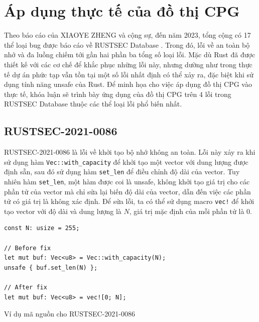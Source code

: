 \section{Áp dụng thực tế của đồ thị CPG}

Theo báo cáo của XIAOYE ZHENG và cộng sự, đến năm 2023, tổng cộng có 17 thể loại bug được báo cáo về RUSTSEC Database \cite{zheng2023closer}. Trong đó, lỗi về an toàn bộ nhớ và đa luồng chiếm tới gần hai phần ba tổng số loại lỗi. Mặc dù Rust đã được thiết kế với các cơ chế để khắc phục những lỗi này, nhưng dường như trong thực tế dự án phức tạp vẫn tồn tại một số lỗi nhất định có thể xảy ra, đặc biệt khi sử dụng tính năng unsafe của Rust. Để minh họa cho việc áp dụng đồ thị CPG vào thực tế, khóa luận sẽ trình bày ứng dụng của đồ thị CPG trên 4 lỗi trong RUSTSEC Database thuộc các thể loại lỗi phổ biến nhất.

\subsection{RUSTSEC-2021-0086}

RUSTSEC-2021-0086 là lỗi về khởi tạo bộ nhớ không an toàn. Lỗi này xảy ra khi sử dụng hàm \texttt{Vec::with\_capacity} để khởi tạo một vector với dung lượng được định sẵn, sau đó sử dụng hàm \texttt{set\_len} để điều chỉnh độ dài của vector. Tuy nhiên hàm \texttt{set\_len}, một hàm được coi là unsafe, không khởi tạo giá trị cho các phần tử của vector mà chỉ sửa lại biến độ dài của vector, dẫn đến việc các phần tử có giá trị là không xác định.
Để sửa lỗi, ta có thể sử dụng macro \texttt{vec!} để khởi tạo vector với độ dài và dung lượng là $N$, giá trị mặc định của mỗi phần tử là $0$.

\begin{listing}[H]
\begin{verbatim}
const N: usize = 255;

// Before fix
let mut buf: Vec<u8> = Vec::with_capacity(N);
unsafe { buf.set_len(N) };

// After fix
let mut buf: Vec<u8> = vec![0; N];
\end{verbatim}
\caption{Ví dụ mã nguồn cho RUSTSEC-2021-0086}
\label{code:c4_RUSTSEC-2021-0086}
\end{listing}


